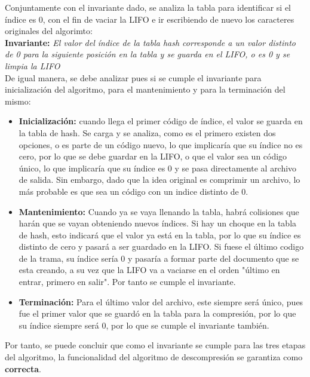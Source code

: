 \documentclass[letterpaper]{article}
\begin{document}
Conjuntamente con el invariante dado, se analiza la tabla para identificar si el índice es 0, con el fin de vaciar la LIFO e ir escribiendo de nuevo los caracteres originales del algorimto:\\

\textbf{Invariante:} \textit{El valor del índice de la tabla hash corresponde a un valor distinto de 0 para la siguiente posición en la tabla y se guarda en el LIFO, o es 0 y se limpia la LIFO}\\


De igual manera, se debe analizar pues si se cumple el invariante para inicialización del algoritmo, para el mantenimiento y para la terminación del mismo:\\

\begin{itemize}
\item \textbf{Inicialización:} cuando llega el primer código de índice, el valor se guarda en la tabla de hash. Se carga y se analiza, como es el primero existen dos opciones, o es parte de un código nuevo, lo que implicaría que su índice no es cero, por lo que se debe guardar en la LIFO, o que el valor sea un código único, lo que implicaría que su índice es 0 y se pasa directamente al archivo de salida. Sin embargo, dado que la idea original es comprimir un archivo, lo más probable es que sea un código con un indice distinto de 0.

\item \textbf{Mantenimiento:} Cuando ya se vaya llenando la tabla, habrá colisiones que harán que se vayan obteniendo nuevos índices. Si hay un choque en la tabla de hash, esto indicará que el valor ya está en la tabla, por lo que su índice es distinto de cero y pasará a ser guardado en la LIFO. Si fuese el último codigo de la trama, su índice sería 0 y pasaría a formar parte del documento que se esta creando, a su vez que la LIFO va a vaciarse en el orden "último en entrar, primero en salir". Por tanto se cumple el invariante.

\item \textbf{Terminación:} Para el último valor del archivo, este siempre será único, pues fue el primer valor que se guardó en la tabla para la compresión, por lo que su índice siempre será 0, por lo que se cumple el invariante también.\\

\end{itemize}

Por tanto, se puede concluir que como el invariante se cumple para las tres etapas del algoritmo, la funcionalidad del algoritmo de descompresión se garantiza como \textbf{correcta}.\\
\end{document}
